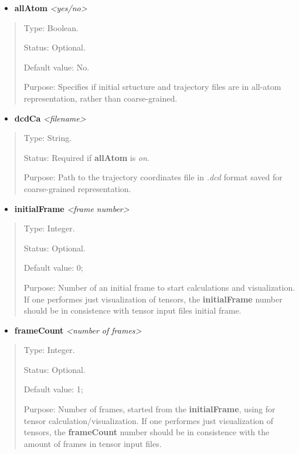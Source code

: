 \documentclass[letterpaper,10pt,english]{sphinxmanual}
\begin{document}
\begin{itemize}
\item {} 
\textbf{allAtom} \emph{\textless{}yes/no\textgreater{}}

\end{itemize}
\begin{quote}

Type: Boolean.

Status: Optional.

Default value: No.

Purpose: Specifies if initial srtucture and trajectory files are in all-atom representation, rather than coarse-grained.
\end{quote}
\begin{itemize}
\item {} 
\textbf{dcdCa} \emph{\textless{}filename\textgreater{}}

\end{itemize}
\begin{quote}

Type: String.

Status: Required if \textbf{allAtom} is \emph{on}.

Purpose:  Path to the trajectory coordinates file in \emph{.dcd} format saved for coarse-grained representation.
\end{quote}
\begin{itemize}
\item {} 
\textbf{initialFrame} \emph{\textless{}frame number\textgreater{}}

\end{itemize}
\begin{quote}

Type: Integer.

Status: Optional.

Default value: 0;

Purpose:  Number of an initial frame to start calculations and visualization. If one performes just visualization of tensors, the \textbf{initialFrame} number should be in consistence with tensor input files initial frame.
\end{quote}
\begin{itemize}
\item {} 
\textbf{frameCount} \emph{\textless{}number of frames\textgreater{}}

\end{itemize}
\begin{quote}

Type: Integer.

Status: Optional.

Default value: 1;

Purpose:  Number of frames, started from the \textbf{initialFrame}, using for tensor calculation/visualization. If one performes just visualization of tensors, the \textbf{frameCount} number should be in consistence with the amount of frames in tensor input files.
\end{quote}
\end{document}
